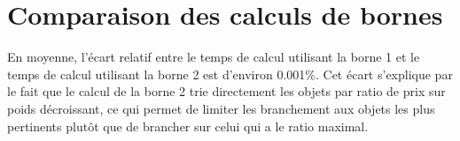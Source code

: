 \section {Comparaison des calculs de bornes}
En moyenne, l'écart relatif entre le temps de calcul utilisant la borne 1 et le temps de calcul utilisant la borne 2 est d'environ 0.001\%.
Cet écart s'explique par le fait que le calcul de la borne 2 trie directement les objets par ratio de prix sur poids décroissant, ce qui permet de limiter les branchement aux objets les plus pertinents plutôt que de brancher sur celui qui a le ratio maximal.